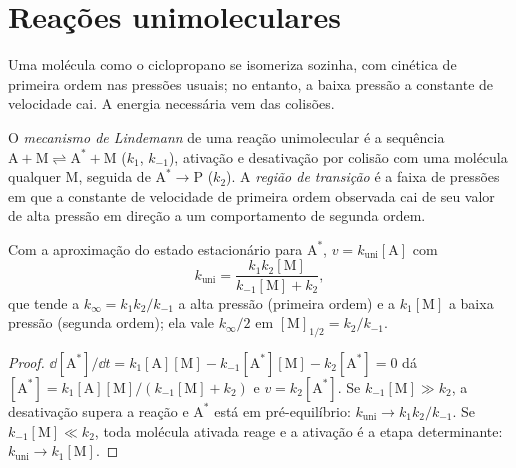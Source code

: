 \section{Reações unimoleculares}

Uma molécula como o ciclopropano se isomeriza sozinha, com cinética de primeira
ordem nas pressões usuais; no entanto, a baixa pressão a constante de velocidade
cai. A energia necessária vem das colisões.

\begin{definition}\label{def:b3:complex-kinetics:lindemann}
O \emph{mecanismo de Lindemann} de uma reação
unimolecular é a sequência $\mathrm{A + M \rightleftharpoons A^* + M}$ ($k_1$, $k_{-1}$), ativação e
desativação por colisão com uma molécula qualquer M, seguida de $\mathrm{A^* \to P}$ ($k_2$). A
\emph{região de transição} é a faixa de pressões em que
a constante de velocidade de primeira ordem observada cai de seu valor de alta
pressão em direção a um comportamento de segunda ordem.
\end{definition}

\begin{theorem}\label{thm:b3:complex-kinetics:lindemann}
Com a aproximação do estado estacionário para $\mathrm{A^*}$, $v = k_{\mathrm{uni}}[\mathrm A]$ com
\[
  k_{\mathrm{uni}} = \frac{k_1k_2[\mathrm M]}{k_{-1}[\mathrm M] + k_2},
\]
que tende a $k_\infty = k_1k_2/k_{-1}$ a alta pressão (primeira ordem) e a $k_1[\mathrm M]$ a
baixa pressão (segunda ordem); ela vale $k_\infty/2$ em $[\mathrm M]_{1/2} = k_2/k_{-1}$.
\end{theorem}

\begin{proof}
$\dd[\mathrm{A^*}]/\dd t = k_1[\mathrm A][\mathrm M] - k_{-1}[\mathrm{A^*}][\mathrm M] - k_2[\mathrm{A^*}] = 0$ dá $[\mathrm{A^*}] =
k_1[\mathrm A][\mathrm M]/(k_{-1}[\mathrm M] + k_2)$ e $v = k_2[\mathrm{A^*}]$. Se $k_{-1}[\mathrm M] \gg k_2$, a desativação
supera a reação e $\mathrm{A^*}$ está em pré-equilíbrio: $k_{\mathrm{uni}} \to k_1k_2/k_{-1}$. Se $k_{-1}[\mathrm M]
\ll k_2$, toda molécula ativada reage e a ativação é a etapa determinante:
$k_{\mathrm{uni}} \to k_1[\mathrm M]$.
\end{proof}

